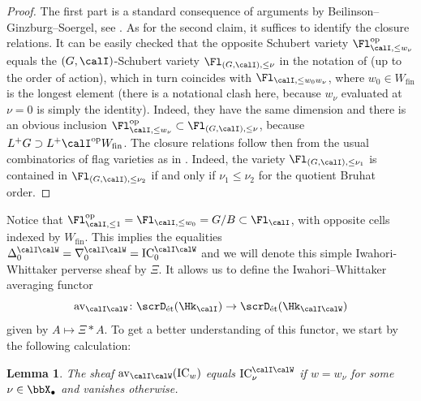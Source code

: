 \documentclass[10pt, reqno]{amsart}
\theoremstyle{plain}
\newtheorem{lemma}[theorem]{Lemma}
\theoremstyle{definition}
\numberwithin{equation}{section}
\begin{document}
\begin{proof}
	The first part is a standard consequence of arguments by Beilinson--Ginzburg--Soergel, see \cite[Theorems 3.2.1 and 3.3.1]{BGS96}. As for the second claim, it suffices to identify the closure relations. It can be easily checked that the opposite Schubert variety $\Fl_{\calI,\leq w_\nu}^{\mathrm{op}}$ equals the $(G,\calI)$-Schubert variety $\Fl_{ (G,\calI),\leq \nu}$ in the notation of \cite[Section 3]{AGLR22} (up to the order of action), which in turn coincides with $\Fl_{ \calI,\leq w_0w_\nu}$, where $w_0 \in W_{\mathrm{fin}}$ is the longest element (there is a notational clash here, because $w_\nu$ evaluated at $\nu=0$ is simply the identity). Indeed, they have the same dimension and there is an obvious inclusion $\Fl_{\calI,\leq w_\nu}^{\mathrm{op}} \subset \Fl_{ (G,\calI),\leq \nu}$, because $L^+G \supset L^+\calI^{\mathrm{op}}W_{\mathrm{fin}}$. The closure relations follow then from the usual combinatorics of flag varieties as in \cite[Section 3]{AGLR22}. Indeed, the variety $\Fl_{ (G,\calI),\leq \nu_1}$ is contained in $\Fl_{ (G,\calI),\leq \nu_2}$ if and only if $\nu_1\leq \nu_2$ for the quotient Bruhat order.
\end{proof}

Notice that $\Fl_{\calI,\leq 1}^{\mathrm{op}}=\Fl_{ \calI,\leq w_0}=G/B \subset \Fl_\calI$, with opposite cells indexed by $W_{\mathrm{fin}}$. This implies the equalities $\Delta_0^{\calI\calW}=\nabla_0^{\calI\calW}=\mathrm{IC}_0^{\calI\calW}$ and we will denote this simple Iwahori-Whittaker perverse sheaf by $\Xi$. It allows us to define the Iwahori--Whittaker averaging functor
\begin{equation}
	\mathrm{av}_{\calI\calW}\colon \scrD_{\mathrm{\acute{e}t}}(\Hk_{\calI}) \to \scrD_{\mathrm{\acute{e}t}}(\Hk_{\calI\calW})
\end{equation}
given by $A \mapsto \Xi\ast A$. To get a better understanding of this functor, we start by the following calculation:

\begin{lemma} \label{Lemma_IW_averaging_kills}
	The sheaf $\mathrm{av}_{\calI\calW}(\mathrm{IC}_w)$ equals $\mathrm{IC}_\nu^{\calI\calW}$ if $w= w_\nu$ for some $\nu\in \bbX_\bullet$ and vanishes otherwise.
\end{lemma}
\end{document}
